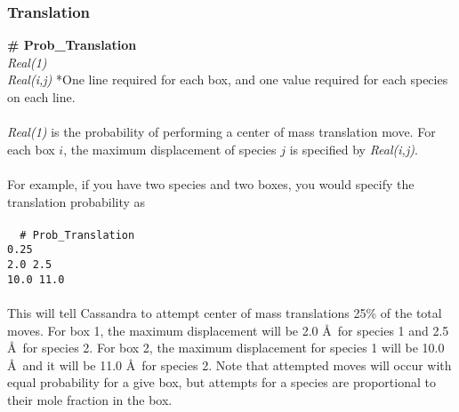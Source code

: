 \subsubsection{Translation}
{\bf \# Prob\_Translation}\\
{\it Real(1)} \\
{\it Real(i,j) } *One line required for each box, and one value required for each species on each line. \\ \\
%
{\it Real(1)} is the probability of performing a center of mass translation move. For each box $i$, the 
maximum displacement of species $j$ is specified by {\it Real(i,j)}.  \\ \\
%
For example, if you have two species and two boxes, you would specify
the translation probability as \\ \\
\texttt{
{ \# Prob\_Translation} \\
 0.25 \\
2.0 2.5\\
10.0 11.0} 
\\ \\
This will tell Cassandra to attempt center of mass translations 25\%
of the total moves. For box 1, the maximum displacement will be 2.0 \AA\ for
species 1 and 2.5 \AA\ for species 2. For box 2, the maximum
displacement for species 1 will be 10.0 \AA\ and it will be 11.0
\AA\ for species 2. Note that attempted moves will occur with equal
probability for a give box, but attempts for a species are
proportional to their mole fraction in the box.

